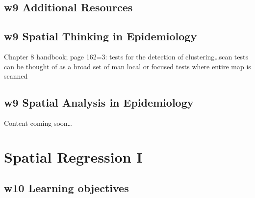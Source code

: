 \documentclass[
]{book}
\begin{document}
\hypertarget{w9-additional-resources}{%
\section{w9 Additional Resources}\label{w9-additional-resources}}

\hypertarget{w9-spatial-thinking-in-epidemiology}{%
\section{w9 Spatial Thinking in Epidemiology}\label{w9-spatial-thinking-in-epidemiology}}

Chapter 8 handbook; page 162=3: tests for the detection of clustering\ldots scan tests can be thought of as a broad set of man local or focused tests where entire map is scanned

\hypertarget{w9-spatial-analysis-in-epidemiology}{%
\section{w9 Spatial Analysis in Epidemiology}\label{w9-spatial-analysis-in-epidemiology}}

Content coming soon\ldots{}

\hypertarget{spatial-regression-i}{%
\chapter{Spatial Regression I}\label{spatial-regression-i}}

\hypertarget{w10-learning-objectives}{%
\section{w10 Learning objectives}\label{w10-learning-objectives}}

 
  \providecommand{\huxb}[2]{\arrayrulecolor[RGB]{#1}\global\arrayrulewidth=#2pt}
  \providecommand{\huxvb}[2]{\color[RGB]{#1}\vrule width #2pt}
  \providecommand{\huxtpad}[1]{\rule{0pt}{#1}}
  \providecommand{\huxbpad}[1]{\rule[-#1]{0pt}{#1}}
\end{document}
